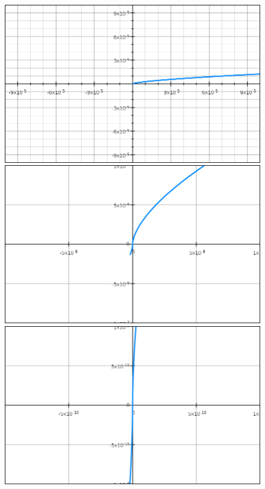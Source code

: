 \documentclass[aspectratio=149]{beamer}
\begin{document}
\begin{frame}
\begin{columns}
\begin{column}{0.5\textwidth}
\begin{figure}
\begin{overprint}
						\includegraphics[width=\textwidth]{pres_img/f4.png}
						\onslide<6>\includegraphics[width=\textwidth]{pres_img/f5.png}
						\onslide<7->\includegraphics[width=\textwidth]{pres_img/f6.png}
					\end{overprint}
				\end{figure}
			\end{column}
		\end{columns}
	\end{frame}
	
\end{document}
